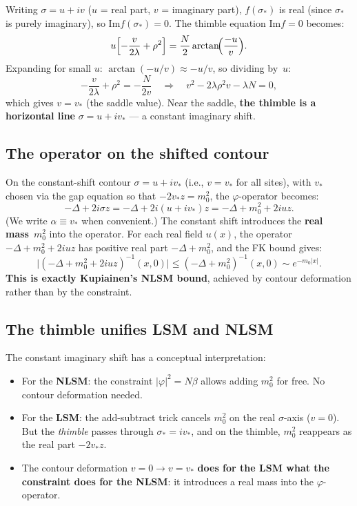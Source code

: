\documentclass[12pt]{article}
\theoremstyle{definition}
\theoremstyle{remark}
\newcommand{\ph}{\varphi}
\newcommand{\im}{\mathrm{Im}}
\begin{document}
Writing $\sigma = u + iv$ ($u$ = real part, $v$ = imaginary part),
$f(\sigma_*)$ is real (since $\sigma_*$ is purely imaginary), so
$\im f(\sigma_*) = 0$. The thimble equation $\im f = 0$ becomes:
\begin{equation}\label{eq:thimble_eq}
  u\Bigl[-\frac{v}{2\lambda} + \rho^2\Bigr]
    = \frac{N}{2}\arctan\!\Bigl(\frac{-u}{v}\Bigr).
\end{equation}
Expanding for small $u$: $\arctan(-u/v) \approx -u/v$, so
dividing by~$u$:
\begin{equation}
  -\frac{v}{2\lambda} + \rho^2 = -\frac{N}{2v}
  \quad\Longrightarrow\quad
  v^2 - 2\lambda \rho^2 v - \lambda N = 0,
\end{equation}
which gives $v = v_*$ (the saddle value). Near the saddle,
\textbf{the thimble is a horizontal line} $\sigma = u + iv_*$ ---
a constant imaginary shift.

\subsection{The operator on the shifted contour}

On the constant-shift contour $\sigma = u + iv_*$
(i.e., $v = v_*$ for all sites), with $v_*$ chosen via the
gap equation so that $-2v_* z = m_0^2$, the $\ph$-operator becomes:
\begin{equation}\label{eq:shifted_op}
  -\Delta + 2i\sigma z = -\Delta + 2i(u + iv_*)z
    = -\Delta + m_0^2 + 2iuz.
\end{equation}
(We write $\alpha \equiv v_*$ when convenient.)
The constant shift introduces the \textbf{real mass}~$m_0^2$ into
the operator. For each real field $u(x)$, the operator
$-\Delta + m_0^2 + 2iuz$ has positive real part $-\Delta + m_0^2$,
and the FK bound gives:
\begin{equation}
  \bigl|(-\Delta + m_0^2 + 2iuz)^{-1}(x,0)\bigr|
    \le (-\Delta + m_0^2)^{-1}(x,0)
    \sim e^{-m_0|x|}.
\end{equation}
\textbf{This is exactly Kupiainen's NLSM bound}, achieved by
contour deformation rather than by the constraint.

\subsection{The thimble unifies LSM and NLSM}

The constant imaginary shift has a conceptual interpretation:
\begin{itemize}
\item For the \textbf{NLSM}: the constraint $|\ph|^2 = N\beta$
  allows adding $m_0^2$ for free. No contour deformation needed.
\item For the \textbf{LSM}: the add-subtract trick cancels $m_0^2$
  on the real $\sigma$-axis ($v = 0$). But the \emph{thimble} passes
  through $\sigma_* = iv_*$, and on the thimble, $m_0^2$ reappears
  as the real part $-2v_* z$.
\item The contour deformation $v = 0 \to v = v_*$
  \textbf{does for the LSM what the constraint does for the NLSM}:
  it introduces a real mass into the $\ph$-operator.
\end{itemize}
\end{document}
